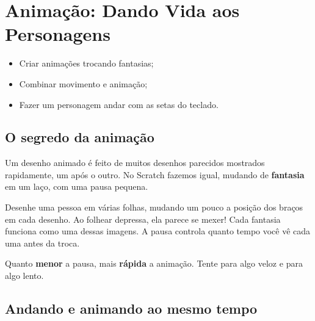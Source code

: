 \chapter{Animação: Dando Vida aos Personagens}

\begin{objetivos}
\begin{itemize}
\item Criar animações trocando fantasias;
\item Combinar movimento e animação;
\item Fazer um personagem andar com as setas do teclado.
\end{itemize}
\end{objetivos}

\section{O segredo da animação}

Um desenho animado é feito de muitos desenhos parecidos mostrados rapidamente, um após o outro. No Scratch fazemos igual, mudando de \textbf{fantasia} em um laço, com uma pausa pequena.

\begin{pensaassim}
Desenhe uma pessoa em várias folhas, mudando um pouco a posição dos braços em cada desenho. Ao folhear depressa, ela parece se mexer! Cada fantasia funciona como uma dessas imagens. A pausa controla quanto tempo você vê cada uma antes da troca.
\end{pensaassim}

\begin{codigo}
\begin{pilha}
\sbcend
\end{pilha}
\end{codigo}

\begin{dica}
Quanto \textbf{menor} a pausa, mais \textbf{rápida} a animação. Tente  para algo veloz e  para algo lento.
\end{dica}

\section{Andando e animando ao mesmo tempo}


